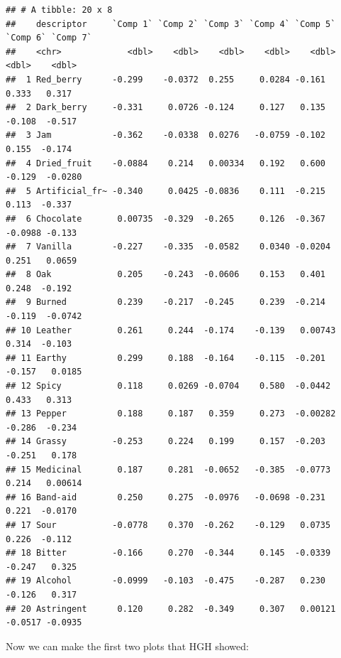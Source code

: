 \documentclass[
]{book}
\begin{document}
\begin{verbatim}
## # A tibble: 20 x 8
##    descriptor     `Comp 1` `Comp 2` `Comp 3` `Comp 4` `Comp 5` `Comp 6` `Comp 7`
##    <chr>             <dbl>    <dbl>    <dbl>    <dbl>    <dbl>    <dbl>    <dbl>
##  1 Red_berry      -0.299    -0.0372  0.255     0.0284 -0.161     0.333   0.317  
##  2 Dark_berry     -0.331     0.0726 -0.124     0.127   0.135    -0.108  -0.517  
##  3 Jam            -0.362    -0.0338  0.0276   -0.0759 -0.102     0.155  -0.174  
##  4 Dried_fruit    -0.0884    0.214   0.00334   0.192   0.600    -0.129  -0.0280 
##  5 Artificial_fr~ -0.340     0.0425 -0.0836    0.111  -0.215     0.113  -0.337  
##  6 Chocolate       0.00735  -0.329  -0.265     0.126  -0.367    -0.0988 -0.133  
##  7 Vanilla        -0.227    -0.335  -0.0582    0.0340 -0.0204    0.251   0.0659 
##  8 Oak             0.205    -0.243  -0.0606    0.153   0.401     0.248  -0.192  
##  9 Burned          0.239    -0.217  -0.245     0.239  -0.214    -0.119  -0.0742 
## 10 Leather         0.261     0.244  -0.174    -0.139   0.00743   0.314  -0.103  
## 11 Earthy          0.299     0.188  -0.164    -0.115  -0.201    -0.157   0.0185 
## 12 Spicy           0.118     0.0269 -0.0704    0.580  -0.0442    0.433   0.313  
## 13 Pepper          0.188     0.187   0.359     0.273  -0.00282  -0.286  -0.234  
## 14 Grassy         -0.253     0.224   0.199     0.157  -0.203    -0.251   0.178  
## 15 Medicinal       0.187     0.281  -0.0652   -0.385  -0.0773    0.214   0.00614
## 16 Band-aid        0.250     0.275  -0.0976   -0.0698 -0.231     0.221  -0.0170 
## 17 Sour           -0.0778    0.370  -0.262    -0.129   0.0735    0.226  -0.112  
## 18 Bitter         -0.166     0.270  -0.344     0.145  -0.0339   -0.247   0.325  
## 19 Alcohol        -0.0999   -0.103  -0.475    -0.287   0.230    -0.126   0.317  
## 20 Astringent      0.120     0.282  -0.349     0.307   0.00121  -0.0517 -0.0935
\end{verbatim}

Now we can make the first two plots that HGH showed:
\end{document}
